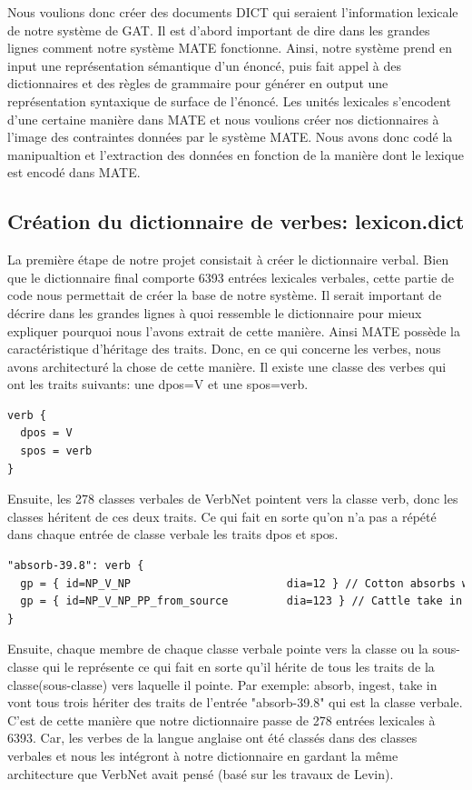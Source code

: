 Nous voulions donc créer des documents DICT qui seraient l'information lexicale de notre système de GAT. Il est d'abord important de dire dans les grandes lignes comment notre système MATE fonctionne. Ainsi, notre système prend en input une représentation sémantique d'un énoncé, puis fait appel à des dictionnaires et des règles de grammaire pour générer en output une représentation syntaxique de surface de l'énoncé. Les unités lexicales s'encodent d'une certaine manière dans MATE et nous voulions créer nos dictionnaires à l'image des contraintes données par le système MATE. Nous avons donc codé la manipualtion et l'extraction des données en fonction de la manière dont le lexique est encodé dans MATE.

\subsection{Création du dictionnaire de verbes: lexicon.dict}

La première étape de notre projet consistait à créer le dictionnaire verbal. Bien que le dictionnaire final comporte 6393 entrées lexicales verbales, cette partie de code nous permettait de créer la base de notre système. Il serait important de décrire dans les grandes lignes à quoi ressemble le dictionnaire pour mieux expliquer pourquoi nous l'avons extrait de cette manière. Ainsi MATE possède la caractéristique d'héritage des traits. Donc, en ce qui concerne les verbes, nous avons architecturé la chose de cette manière. Il existe une classe des verbes qui ont les traits suivants: une dpos=V et une spos=verb.

\begin{lstlisting}[language=XML]
verb {
  dpos = V
  spos = verb
}
\end{lstlisting}

Ensuite, les 278 classes verbales de VerbNet pointent vers la classe verb, donc les classes héritent de ces deux traits. Ce qui fait en sorte qu'on n'a pas a répété dans chaque entrée de classe verbale les traits dpos et spos. 

\begin{lstlisting}[language=XML]
"absorb-39.8": verb {
  gp = { id=NP_V_NP                        dia=12 } // Cotton absorbs water.
  gp = { id=NP_V_NP_PP_from_source         dia=123 } // Cattle take in nutrients from their feed.
}
\end{lstlisting}

Ensuite, chaque membre de chaque classe verbale pointe vers la classe ou la sous-classe qui le représente ce qui fait en sorte qu'il hérite de tous les traits de la classe(sous-classe) vers laquelle il pointe. Par exemple: absorb, ingest, take in vont tous trois hériter des traits de l'entrée "absorb-39.8" qui est la classe verbale. C'est de cette manière que notre dictionnaire passe de 278 entrées lexicales à 6393. Car, les verbes de la langue anglaise ont été classés dans des classes verbales et nous les intégront à notre dictionnaire en gardant la même architecture que VerbNet avait pensé (basé sur les travaux de Levin).

